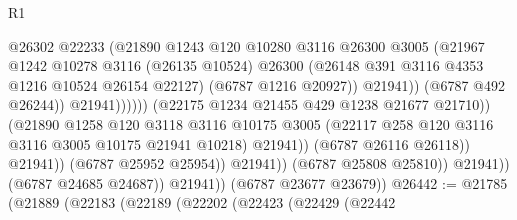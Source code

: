\begin{lexlean}{R1}
\begin{coremodule}
                                                  @26302
                                                  @22233
                                                  (@21890
                                                    @1243
                                                    @120
                                                    @10280
                                                    @3116
                                                    @26300
                                                    @3005
                                                    (@21967
                                                      @1242
                                                      @10278
                                                      @3116
                                                      (@26135 @10524)
                                                      @26300
                                                      (@26148
                                                        @391
                                                        @3116
                                                        @4353
                                                        @1216
                                                        @10524
                                                        @26154
                                                        @22127)
                                                      (@6787 @1216 @20927))
                                                    @21941))
                                                (@6787 @492 @26244))
                                              @21941))))))
                                  (@22175 @1234 @21455 @429 @1238 @21677 @21710))
                                (@21890
                                  @1258
                                  @120
                                  @3118
                                  @3116
                                  @10175
                                  @3005
                                  (@22117 @258 @120 @3116 @3116 @3005 @10175 @21941 @10218)
                                  @21941))
                              (@6787 @26116 @26118))
                            @21941))
                        (@6787 @25952 @25954))
                      @21941))
                  (@6787 @25808 @25810))
                @21941))
            (@6787 @24685 @24687))
          @21941))
      (@6787 @23677 @23679))
@26442 := @21785
    (@21889
      (@22183
        (@22189
          (@22202
            (@22423
              (@22429
                (@22442

\end{coremodule}
\end{lexlean}
